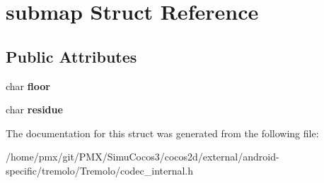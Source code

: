 \hypertarget{structsubmap}{}\section{submap Struct Reference}
\label{structsubmap}
\subsection*{Public Attributes}
\begin{DoxyCompactItemize}
\item 
\mbox{\label{structsubmap_ab55b21ad6e3895c9a5b64ae143900b89}} 
char {\bfseries floor}
\item 
\mbox{\label{structsubmap_ad0acb7dc85e5fc24002e44d00eaed957}} 
char {\bfseries residue}
\end{DoxyCompactItemize}


The documentation for this struct was generated from the following file\+:\begin{DoxyCompactItemize}
\item 
/home/pmx/git/\+P\+M\+X/\+Simu\+Cocos3/cocos2d/external/android-\/specific/tremolo/\+Tremolo/codec\+\_\+internal.\+h\end{DoxyCompactItemize}
